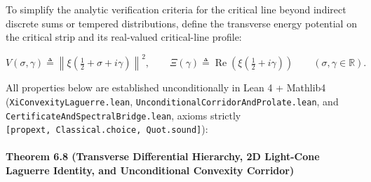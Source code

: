 \documentclass[
  11pt,
]{article}
\begin{document}
To simplify the analytic verification criteria for the critical line
beyond indirect discrete sums or tempered distributions, define the
transverse energy potential on the critical strip and its real-valued
critical-line profile:

\[V(\sigma, \gamma) \triangleq \left\|\xi\!\left(\tfrac{1}{2} + \sigma + i\gamma\right)\right\|^2, \qquad \Xi(\gamma) \triangleq \operatorname{Re}\!\left(\xi\!\left(\tfrac{1}{2} + i\gamma\right)\right) \qquad (\sigma, \gamma \in \mathbb{R}).\]

All properties below are established unconditionally in Lean 4 +
Mathlib4 (\texttt{XiConvexityLaguerre.lean},
\texttt{UnconditionalCorridorAndProlate.lean}, and
\texttt{CertificateAndSpectralBridge.lean}, axioms strictly
\texttt{{[}propext,\ Classical.choice,\ Quot.sound{]}}):

\paragraph{Theorem 6.8 (Transverse Differential Hierarchy, 2D Light-Cone
Laguerre Identity, and Unconditional Convexity
Corridor)}\label{theorem-6.8-transverse-differential-hierarchy-2d-light-cone-laguerre-identity-and-unconditional-convexity-corridor}
\end{document}
